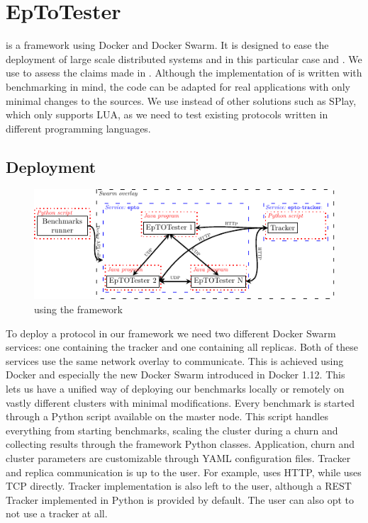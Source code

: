 \section{EpToTester}
\label{sec:epto}
\eptotester is a framework using Docker and Docker Swarm. It is designed to ease the deployment of large scale distributed systems and in this particular case \jgroups and \epto. We use \eptotester to assess the claims made in \autocite{matos2015epto}. Although the implementation of \epto is written with benchmarking in mind, the code can be adapted for real applications with only minimal changes to the sources. We  use \eptotester instead of other solutions such as SPlay, which only supports LUA, as we need to test existing protocols written in different programming languages.
\subsection{Deployment}
\begin{figure}[htp]
	\centering
	\includegraphics[width=\linewidth]{figures/complete-architecture.pdf}
	\vspace{-2mm} 
	\caption[Caption]{\epto using the \eptotester{} framework\footnotemark}
	\vspace{-2mm} 
	\label{fig:complete-architecture}
\end{figure}
To deploy a protocol in our framework we need two different Docker Swarm services: one containing the tracker and one containing all replicas. Both of these services use the same network overlay to communicate. This is achieved using Docker and especially the new Docker Swarm introduced in Docker 1.12. This lets us have a unified way of deploying our benchmarks locally or remotely on vastly different clusters with minimal modifications. Every benchmark is started through a Python script available on the master node. This script handles everything from starting benchmarks, scaling the cluster during a churn and collecting results through the framework Python classes. Application, churn and cluster  parameters are customizable through YAML configuration files. Tracker and replica communication is up to the user. For example, \epto uses HTTP, while \jgroups uses TCP directly. Tracker implementation is also left to the user, although a REST Tracker implemented in Python is provided by default. The user can also opt to not use a tracker at all.
